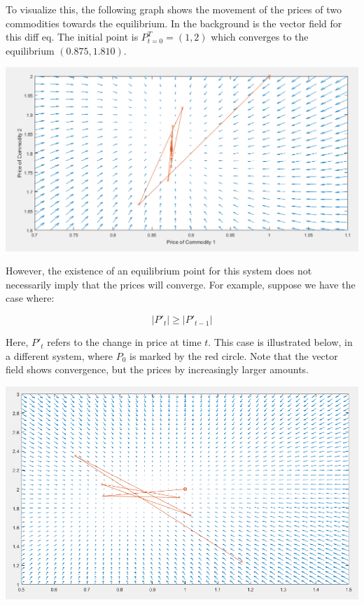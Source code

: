\documentclass[12pt]{article}
\begin{document}
To visualize this, the following graph shows the movement of the prices of two commodities towards the equilibrium. In the background is the vector field for this diff eq. The initial point is $P_{t=0}^T = (1,2)$ which converges to the equilibrium $(0.875,1.810)$.

\begin{center}
	\includegraphics[scale = 0.5]{figures/vector_field}
\end{center}

However, the existence of an equilibrium point for this system does not necessarily imply that the prices will converge. For example, suppose we have the case where:

$$| P'_t | \geq | P'_{t-1} | $$

Here, $P'_t$ refers to the change in price at time $t$. This case is illustrated below, in a different system, where $P_0$ is marked by the red circle. Note that the vector field shows convergence, but the prices by increasingly larger amounts. 

\begin{center}
	\includegraphics[scale = 0.5]{figures/vector_field2}
\end{center}
\end{document}
